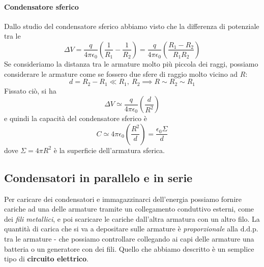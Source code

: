 \paragraph{Condensatore sferico}
Dallo studio del condensatore sferico %
abbiamo visto che la differenza di potenziale tra le 
\begin{equation*}
	\Delta V=\frac{q}{4\pi\epsilon_0}\left(\frac{1}{R_1}-\frac{1}{R_2}\right)=\frac{q}{4\pi\epsilon_0}\left(\frac{R_1-R_2}{R_1R_2}\right)
\end{equation*}
Se consideriamo la distanza tra le armature molto più piccola dei raggi, possiamo considerare le armature come se fossero due sfere di raggio molto vicino ad $R$:
\begin{equation*}
	d=R_2-R_1\ll R_1,\ R_2\implies R\sim R_2\sim R_1
\end{equation*}
Fissato ciò, si ha
\begin{equation*}
	\Delta V\simeq\frac{q}{4\pi\epsilon_0}\left(\frac{d}{R^2}\right)
\end{equation*}
e quindi la capacità del condensatore sferico è
\begin{equation}
	C\simeq 4\pi\epsilon_0\left(\frac{R^2}{d}\right)=\frac{\epsilon_0\Sigma}{d}
\end{equation}
dove $\Sigma=4\pi R^2$ è la superficie dell'armatura sferica.
\subsection{Condensatori in parallelo e in serie}
Per caricare dei condensatori e immagazzinarci dell'energia possiamo fornire cariche ad una delle armature tramite un collegamento conduttivo esterni, come dei \textit{fili metallici}, e poi scaricare le cariche dall'altra armatura con un altro filo. La quantità di carica che si va a depositare sulle armature è \textit{proporzionale} alla $\mathrm{d.d.p.}$ tra le armature - che possiamo controllare collegando ai capi delle armature una batteria o un generatore con dei fili. Quello che abbiamo descritto è un semplice tipo di \textbf{circuito elettrico}.

